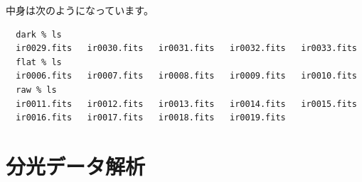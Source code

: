 中身は次のようになっています。
\begin{verbatim}
  dark % ls
  ir0029.fits   ir0030.fits   ir0031.fits   ir0032.fits   ir0033.fits
  flat % ls
  ir0006.fits   ir0007.fits   ir0008.fits   ir0009.fits   ir0010.fits
  raw % ls
  ir0011.fits   ir0012.fits   ir0013.fits   ir0014.fits   ir0015.fits
  ir0016.fits   ir0017.fits   ir0018.fits   ir0019.fits
\end{verbatim}

\section{分光データ解析} %
\label{sect:spec_ana}